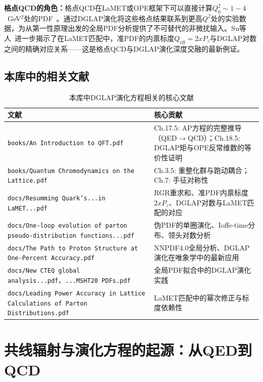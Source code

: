 \documentclass[12pt,a4paper]{ctexart}
\theoremstyle{definition}
\begin{document}
\textbf{格点QCD的角色：}格点QCD在LaMET或OPE框架下可以直接计算$Q_0^2 \sim 1-4$~GeV$^2$处的PDF~\cite{Ji2013Euclidean,Ji2014LaMET,Radyushkin2018oneLoop}。通过DGLAP演化将这些格点结果联系到更高$Q^2$处的实验数据，为从第一性原理出发的全局PDF分析提供了不可替代的非微扰输入。Su等人~\cite{Su2023RGR}进一步揭示了在LaMET匹配中，准PDF的内禀标度$Q_{\text{eff}} = 2xP_z$与DGLAP对数之间的精确对应关系——这是格点QCD与DGLAP演化深度交融的最新例证。

\subsection{本库中的相关文献}

\begin{table}[H]
\centering
\caption{本库中DGLAP演化方程相关的核心文献}
\label{tab:DGLAP_papers}
\small
\begin{tabular}{lp{7cm}}
\toprule
文献 & 核心贡献 \\
\midrule
\texttt{books/An Introduction to QFT.pdf} & Ch.17.5: AP方程的完整推导（QED$\to$QCD）；Ch.18.5: DGLAP矩与OPE反常维数的等价性证明 \\
\texttt{books/Quantum Chromodynamics on the Lattice.pdf} & Ch.3.5: 重整化群与跑动耦合；Ch.7: 手征对称性 \\
\texttt{docs/Resumming Quark's...in LaMET...pdf}~\cite{Su2023RGR} &
RGR重求和、准PDF内禀标度$2xP_z$、DGLAP对数与LaMET匹配的对应 \\
\texttt{docs/One-loop evolution of parton pseudo-distribution functions...pdf}~\cite{Radyushkin2018oneLoop} &
伪PDF的单圈演化、Ioffe-time分布、领头对数分析 \\
\texttt{docs/The Path to Proton Structure at One-Percent Accuracy.pdf} &
NNPDF4.0全局分析、DGLAP演化在唯象学中的最新应用 \\
\texttt{docs/New CTEQ global analysis...pdf}、\texttt{...MSHT20 PDFs.pdf} &
全局PDF拟合中的DGLAP演化实践 \\
\texttt{docs/Leading Power Accuracy in Lattice Calculations of Parton Distributions.pdf} &
LaMET匹配中的幂次修正与标度依赖性 \\
\bottomrule
\end{tabular}
\end{table}

\section{共线辐射与演化方程的起源：从QED到QCD}
\end{document}
